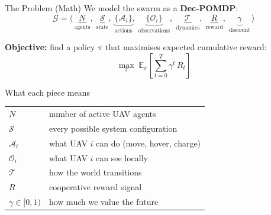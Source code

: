\documentclass[aspectratio=169,12pt]{beamer}
\begin{document}
\begin{frame}{The Problem (Math)}
We model the swarm as a \textbf{Dec-POMDP}:
\[
\mathcal{G} = \bigl\langle\,
  \underbrace{N}_{\text{agents}},\;
  \underbrace{\mathcal{S}}_{\text{state}},\;
  \underbrace{\{\mathcal{A}_i\}}_{\text{actions}},\;
  \underbrace{\{\mathcal{O}_i\}}_{\text{observations}},\;
  \underbrace{\mathcal{T}}_{\text{dynamics}},\;
  \underbrace{R}_{\text{reward}},\;
  \underbrace{\gamma}_{\text{discount}}
\,\bigr\rangle
\]

\vspace{0.4em}
\textbf{Objective:} find a policy $\pi$ that maximises expected cumulative reward:
\[
\max_{\pi}\;
\mathbb{E}_{\pi}
\!\left[
  \sum_{t=0}^{T} \gamma^{t}\, R_t
\right]
\]

\vspace{0.4em}
\begin{block}{What each piece means}
\begin{tabular}{@{}ll@{}}
$N$ & number of active UAV agents \\
$\mathcal{S}$ & every possible system configuration \\
$\mathcal{A}_i$ & what UAV $i$ can do (move, hover, charge) \\
$\mathcal{O}_i$ & what UAV $i$ can see locally \\
$\mathcal{T}$ & how the world transitions \\
$R$ & cooperative reward signal \\
$\gamma \in [0,1)$ & how much we value the future \\
\end{tabular}
\end{block}
\end{frame}

\end{document}
